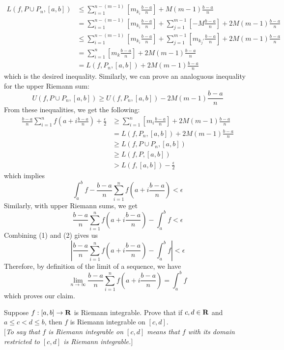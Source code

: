 \begin{solution}
    \begin{align*}
        L(f, P\cup P_n, [a,b]) &\leq \sum_{i=1}^{n - (m-1)} \left[ m_{k_i}\frac{b-a}{n} \right] +  M(m-1)\frac{b-a}{n} \\
        &= \sum_{i=1}^{n - (m-1)} \left[ m_{k_i}\frac{b-a}{n} \right] + \sum_{j=1}^{m-1}\left[-M\frac{b-a}{n}\right] + 2M(m-1)\frac{b-a}{n} \\
        &\leq \sum_{i=1}^{n - (m-1)} \left[ m_{k_i}\frac{b-a}{n} \right] + \sum_{j=1}^{m-1}\left[m_{k_j'}\frac{b-a}{n}\right] + 2M(m-1)\frac{b-a}{n} \\
        &= \sum_{i=1}^{n} \left[ m_k\frac{b-a}{n} \right] + 2M(m-1)\frac{b-a}{n} \\
        &= L(f, P_n, [a,b]) + 2M(m-1)\frac{b-a}{n}
    \end{align*}
    which is the desired inequality. Similarly, we can prove an analoguous inequality for the upper Riemann sum:
    $$U(f, P \cup P_n, [a,b]) \geq U(f, P_n, [a,b]) - 2M(m-1)\frac{b-a}{n}$$
    From these inequalities, we get the following:
    \begin{align*}
        \frac{b-a}{n}\sum_{i=1}^{n}f\left(a + i\frac{b-a}{n}\right) + \frac{\epsilon}{2} &\geq \sum_{i=1}^{n}\left[m_i \frac{b-a}{n}\right] + 2M(m-1)\frac{b-a}{n} \\
        &= L(f, P_n, [a,b]) + 2M(m-1)\frac{b-a}{n} \\
        &\geq L(f, P \cup P_n, [a,b]) \\
        &\geq L(f, P, [a,b]) \\
        &> L(f, [a,b]) - \frac{\epsilon}{2}
    \end{align*}
    which implies
    \[\int_{a}^{b}f - \frac{b-a}{n}\sum_{i=1}^{n}f\left(a + i\frac{b-a}{n}\right) < \epsilon \tag*{(1)} \]
    Similarly, with upper Riemann sums, we get
    \[\frac{b-a}{n}\sum_{i=1}^{n}f\left(a + i\frac{b-a}{n}\right) - \int_{a}^{b}f < \epsilon \tag*{(2)} \]
    Combining (1) and (2) gives us
    $$\left| \frac{b-a}{n}\sum_{i=1}^{n}f\left(a + i\frac{b-a}{n}\right) - \int_{a}^{b}f \right| < \epsilon$$
    Therefore, by definition of the limit of a sequence, we have
    $$\lim_{n \rightarrow \infty} \frac{b-a}{n}\sum_{i=1}^{n}f\left(a + i\frac{b-a}{n}\right) = \int_{a}^{b}f$$
    which proves our claim. \\
\end{solution}

\begin{exercise}
    Suppose $f : [a,b] \to \mathbf{R}$ is Riemann integrable. Prove that if $c,d \in \mathbf{R}$ and $a \leq c < d \leq b$, then $f$ is Riemann integrable on $[c,d]$. \\ $[$\textit{To say that $f$ is Riemann integrable on $[c,d]$ means that $f$ with its domain restricted to $[c,d]$ is Riemann integrable.}$]$ \\
\end{exercise}


